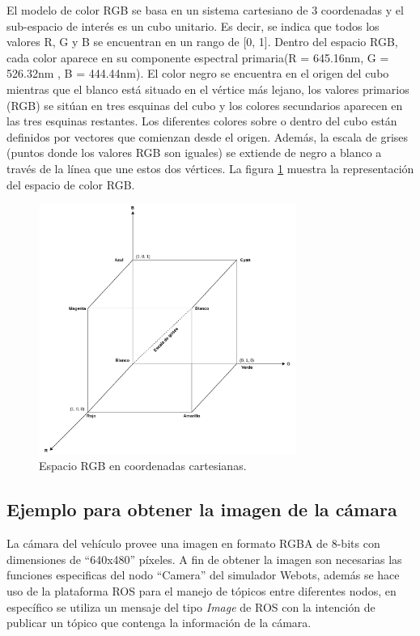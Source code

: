 El modelo de color RGB se basa en un sistema cartesiano de 3 coordenadas y el sub-espacio de interés es un cubo unitario. Es decir, se indica que todos los valores R, G y B se encuentran en un rango de [0, 1]. Dentro del espacio RGB, cada color aparece en su componente espectral primaria(R = 645.16nm, G = 526.32nm , B = 444.44nm)\cite{levinson2011towards}. El color negro se encuentra en el origen del cubo mientras que el blanco está situado en el vértice más lejano, los valores primarios (RGB) se sitúan en tres esquinas del cubo y los colores secundarios aparecen en las tres esquinas restantes. Los diferentes colores sobre o dentro del cubo están definidos por vectores que comienzan desde el origen. Además, la escala de grises (puntos donde los valores RGB son iguales) se extiende de negro a blanco a través de la línea que une estos dos vértices. La figura \ref{fig:rgb_cube} muestra la representación del espacio de color RGB.
\begin{figure}[h]
    \centering
    \includegraphics[width=0.75\textwidth]{Figures/Figures_Cap04/rgb_cube.pdf}
    \caption{Espacio RGB en coordenadas cartesianas.}
    \label{fig:rgb_cube}
\end{figure}

\subsection{Ejemplo para obtener la imagen de la cámara} \label{sub:ejemplo_para_obtener_la_imagen_de_la_cámara}

La cámara del vehículo provee una imagen en formato RGBA de 8-bits con dimensiones de ``640x480'' píxeles. A fin de obtener la imagen son necesarias las funciones especificas del nodo ``Camera'' del simulador Webots, además se hace uso de la plataforma ROS para el manejo de tópicos entre diferentes nodos, en específico se utiliza un mensaje del tipo \textit{Image} de ROS con la intención de publicar un tópico que contenga la información de la cámara. 

